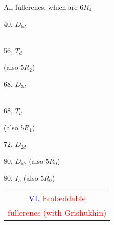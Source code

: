 \documentclass[%
pdf,
colorBG,
slideColor,
]{prosper}
\begin{document}
\begin{slide}{All fullerenes, which are $6R_4$}
\begin{center}
\begin{minipage}[b]{2.7cm}
\centering
{}\par
40, $D_{5d}$\\
\textcolor{white}{Bonjour}
\end{minipage}
\begin{minipage}[b]{2.7cm}
\centering
{}\par
56, $T_d$\par
(also $5R_2$)
\end{minipage}
\begin{minipage}[b]{2.7cm}
\centering
{}\par
68, $D_{3d}$\\
\textcolor{white}{Bonjour}
\end{minipage}
\begin{minipage}[b]{2.7cm}
\centering
{}\par
68, $T_d$\par
(also $5R_1$)
\end{minipage}
\begin{minipage}[b]{3.3cm}
\centering
{}\par
72, $D_{2d}$
\end{minipage}
\begin{minipage}[b]{3.5cm}
\centering
{}\par
80, $D_{5h}$ (also $5R_0$)
\end{minipage}
\begin{minipage}[b]{3.3cm}
\centering
{}\par
80, $I_h$ (also $5R_0$)
\end{minipage}
\end{center}
\end{slide}

\begin{slide}{}
\begin{center}
{\Huge 
\begin{tabular*}{11cm}{c}
\\[-0.4cm]
\textcolor{blue}{VI. }\textcolor{red}{Embeddable}\\
\textcolor{red}{fullerenes (with Grishukhin)}
\end{tabular*}
}
\end{center}
\end{slide}
\end{document}
